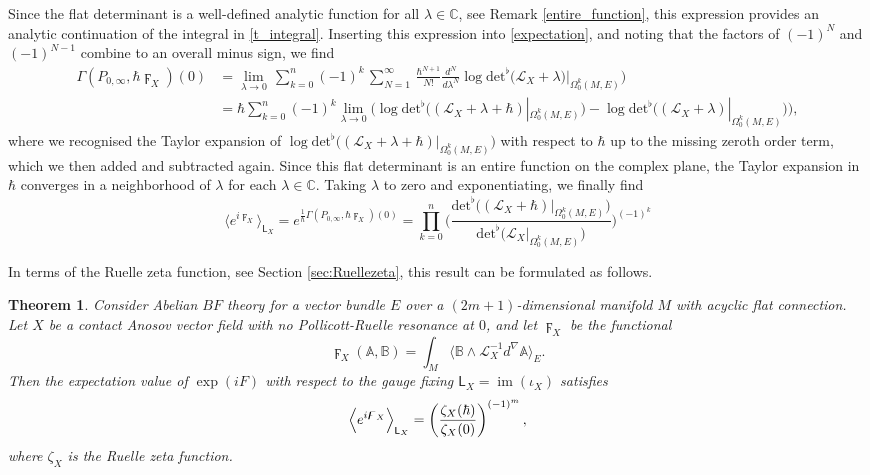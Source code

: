 \documentclass[reqno]{amsart}
\newtheorem{thm}{Theorem}[section]
\theoremstyle{definition}
\theoremstyle{remark}
\newcommand{\A}{\mathbb{A}}
\newcommand{\B}{\mathbb{B}}
\renewcommand{\d}{d^\nabla}
\newcommand{\h}{\hbar}
\newcommand{\sfL}{\mathsf{L}}
\renewcommand{\L}{\mathcal{L}}
\renewcommand{\det}{\mathrm{det}^\flat}
\DeclareMathOperator{\im}{im}
\begin{document}
Since the flat determinant is a well-defined analytic function for all $\lambda\in\mathbb{C}$, see Remark \ref{entire_function}, this expression provides an analytic continuation of the integral in \eqref{t_integral}. Inserting this expression into \eqref{expectation}, and noting that the factors of $(-1)^N$ and $(-1)^{N-1}$ combine to an overall minus sign, we find
\begin{equation*}
\begin{split}
    \Gamma(P_{0,\infty}, \h \digamma_X)(0) &= \lim_{\lambda\to 0}\,\sum_{k=0}^n (-1)^k\, \sum_{N=1}^\infty\,\frac{\hbar^{N+1}}{N!} \frac{d^N}{d\lambda^N}\log\det\big(\L_X+\lambda)|_{\Omega_0^k(M,E)}\big) \\
    &= \h\sum_{k=0}^n (-1)^k\lim_{\lambda\to 0} \big(\log\det\big((\L_X+\lambda+\h)|_{\Omega_0^k(M,E)}\big)-\log\det\big((\L_X+\lambda)|_{\Omega_0^k(M,E)}\big)\big),
\end{split}
\end{equation*}
where we recognised the Taylor expansion of $\log\det\big((\L_X+\lambda+\h)|_{\Omega_0^k(M,E)}\big)$ with respect to $\h$ up to the missing zeroth order term, which we then added and subtracted again. Since this flat determinant is an entire function on the complex plane, the Taylor expansion in $\h$ converges in a neighborhood of $\lambda$ for each $\lambda\in\mathbb{C}$. 
Taking $\lambda$ to zero and exponentiating, we finally find
\begin{equation}
\label{expectation_ruelle}
    \biggl\langle e^{i\digamma_X} \biggr\rangle_{\sfL_X} = e^{\frac{1}{\h}\Gamma(P_{0,\infty}, \h \digamma_X)(0)} = \prod_{k=0}^n\biggl(\frac{\det\big((\L_X+\h)|_{\Omega_0^k(M,E)}\big)}{\det\big(\L_X|_{\Omega_0^k(M,E)}\big)}\biggr)^{(-1)^k}
\end{equation}

In terms of the Ruelle zeta function, see Section \ref{sec:Ruellezeta}, this result can be formulated as follows.

\begin{thm}\label{thm:result_expectation}
Consider Abelian $BF$ theory for a vector bundle $E$ over a $(2m+1)$-dimensional manifold $M$ with acyclic flat connection.
Let $X$ be a contact Anosov vector field with no Pollicott-Ruelle resonance at $0$, and let $\digamma_X$ be the functional
$$\digamma_X(\A,\B) = \int_M \langle\B\wedge\L_X^{-1}\d\A\rangle_E.$$
Then the expectation value of $\exp(iF)$ with respect to the gauge fixing $\sfL_X=\im(\iota_X)$ satisfies
\begin{equation}
    \Bigl\langle e^{i\digamma_X} \Bigr\rangle_{\sfL_X} = \left(\frac{\zeta_X(\h)}{\zeta_{X}(0)}\right)^{(-1)^m},
\end{equation}
where $\zeta_X$ is the Ruelle zeta function. 
\end{thm}
\end{document}
